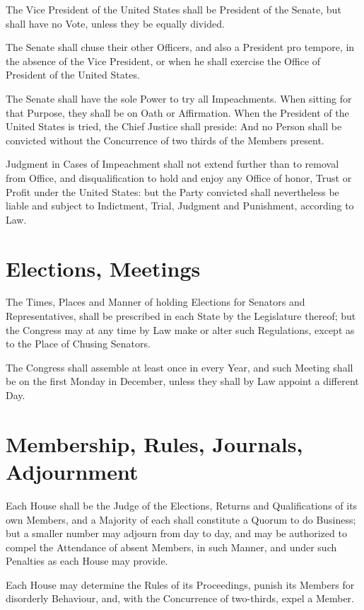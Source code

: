 \documentclass{constitution}
\begin{document}
The Vice President of the United States shall be President of the Senate,
but shall have no Vote, unless they be equally divided.

The Senate shall chuse their other Officers,
and also a President pro tempore, in the absence of the Vice President,
or when he shall exercise the Office of President of the United States.

The Senate shall have the sole Power to try all Impeachments.
When sitting for that Purpose, they shall be on Oath or Affirmation.
When the President of the United States is tried, the Chief Justice shall preside:
And no Person shall be convicted without the Concurrence
of two thirds of the Members present.

Judgment in Cases of Impeachment shall not extend further than to removal from Office,
and disqualification to hold and enjoy any Office
of honor, Trust or Profit under the United States:
but the Party convicted shall nevertheless be liable and subject to
Indictment, Trial, Judgment and Punishment, according to Law.

\section{Elections, Meetings}
The Times, Places and Manner of holding Elections for Senators and Representatives,
shall be prescribed in each State by the Legislature thereof;
but the Congress may at any time by Law make or alter such Regulations,
except as to the Place of Chusing Senators.

The Congress shall assemble at least once in every Year,
and such Meeting shall be on the first Monday in December,
unless they shall by Law appoint a different Day.

\section{Membership, Rules, Journals, Adjournment}
Each House shall be the Judge of the Elections, Returns and Qualifications of its own Members,
and a Majority of each shall constitute a Quorum to do Business;
but a smaller number may adjourn from day to day,
and may be authorized to compel the Attendance of absent Members,
in such Manner, and under such Penalties as each House may provide.

Each House may determine the Rules of its Proceedings,
punish its Members for disorderly Behaviour,
and, with the Concurrence of two-thirds, expel a Member.
\end{document}
